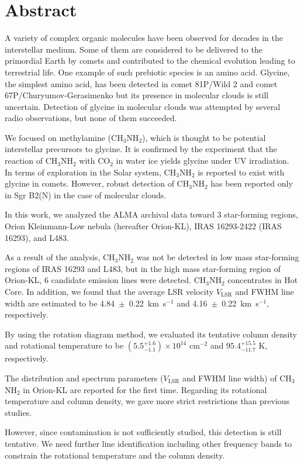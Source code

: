 \chapter*{Abstract}

\singlespacing

A variety of complex organic molecules have been observed for decades in the interstellar medium.
Some of them are considered to be delivered to the primordial Earth by comets 
and contributed to the chemical evolution leading to terrestrial life.
One example of such prebiotic species is an amino acid. Glycine, the simplest amino acid, 
has been detected in comet 81P/Wild 2 and comet 67P/Churyumov-Gerasimenko but its presence in molecular clouds 
is still uncertain. Detection of glycine in molecular clouds was attempted by several radio observations, 
but none of them succeeded.

We focused on methylamine (CH$_3$NH$_2$), which is thought to be potential interstellar precursors to glycine. 
It is confirmed by the experiment that the reaction of CH$_3$NH$_2$ with CO$_2$ in water ice 
yields glycine under UV irradiation. 
In terms of exploration in the Solar system, CH$_3$NH$_2$ is reported to exist with glycine in comets. 
However, robust detection of CH$_3$NH$_2$ has been reported only in Sgr B2(N) in the case of molecular clouds.

In this work, we analyzed the ALMA archival data toward 3 star-forming regions, 
Orion Kleinmann-Low nebula (hereafter Orion-KL), IRAS 16293-2422 (IRAS 16293), and L483.

As a result of the analysis, CH$_3$NH$_2$ was not be detected in low mass star-forming regions of IRAS 16293 and L483, 
but in the high mass star-forming region of Orion-KL, 6 candidate emission lines were detected.
CH$_3$NH$_2$ concentrates in Hot Core. In addition, we found that the average LSR velocity $V_{\mathrm{LSR}}$ and FWHM line width are estimated to be 4.84~$\pm$~0.22~km~s$^{-1}$ 
and 4.16~$\pm$~0.22~km~s$^{-1}$, respectively. 

By using the rotation diagram method, we evaluated its tentative column density 
and rotational temperature to be $(5.5^{+1.6}_{-1.1} ) \times 10^{14}$ cm$^{-2}$ and $95.4^{+15.5}_{-11.7} \,\,\mathrm{K}$, respectively. 

The distribution and spectrum parameters ($V_{\mathrm{LSR}}$ and FWHM line width) of CH$_3$NH$_2$ in Orion-KL are reported for the first time.
Regarding its rotational temperature and column density, we gave more strict restrictions than previous studies.

However, since contamination is not sufficiently studied, this detection is still tentative.
We need further line identification including other frequency bands to constrain the rotational temperature and the column density.

\doublespacing
